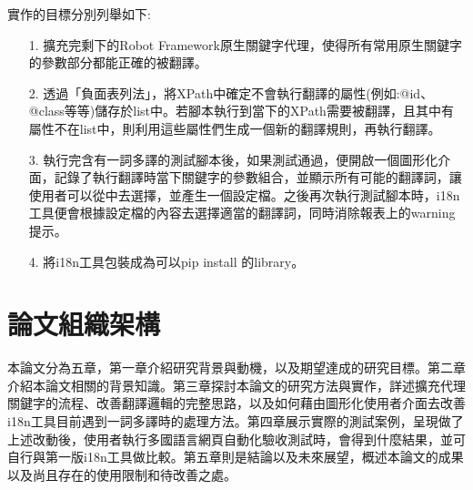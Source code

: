 實作的目標分別列舉如下:
\begin{itemize}
\item[1.] 擴充完剩下的Robot Framework原生關鍵字代理，使得所有常用原生關鍵字的參數部分都能正確的被翻譯。
\item[2.] 透過「負面表列法」，將XPath中確定不會執行翻譯的屬性(例如:@id、@class等等)儲存於list中。若腳本執行到當下的XPath需要被翻譯，且其中有屬性不在list中，則利用這些屬性們生成一個新的翻譯規則，再執行翻譯。
\item[3.] 執行完含有一詞多譯的測試腳本後，如果測試通過，便開啟一個圖形化介面，記錄了執行翻譯時當下關鍵字的參數組合，並顯示所有可能的翻譯詞，讓使用者可以從中去選擇，並產生一個設定檔。之後再次執行測試腳本時，i18n工具便會根據設定檔的內容去選擇適當的翻譯詞，同時消除報表上的warning提示。 
\item[4.] 將i18n工具包裝成為可以pip\cite{PIP} install 的library。
\end{itemize}

\section{論文組織架構}
本論文分為五章，第一章介紹研究背景與動機，以及期望達成的研究目標。第二章介紹本論文相關的背景知識。第三章探討本論文的研究方法與實作，詳述擴充代理關鍵字的流程、改善翻譯邏輯的完整思路，以及如何藉由圖形化使用者介面去改善i18n工具目前遇到一詞多譯時的處理方法。第四章展示實際的測試案例，呈現做了上述改動後，使用者執行多國語言網頁自動化驗收測試時，會得到什麼結果，並可自行與第一版i18n工具\cite{i18n}做比較。第五章則是結論以及未來展望，概述本論文的成果以及尚且存在的使用限制和待改善之處。
